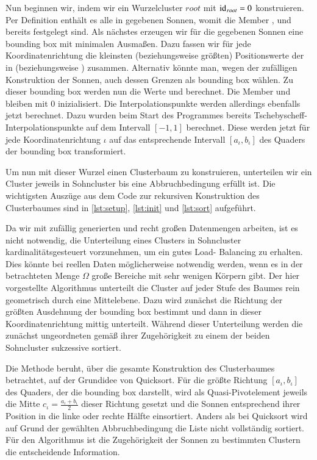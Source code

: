     Nun beginnen wir, indem wir ein Wurzelcluster $root$ mit $\tcode{id}_{root} = 0$ konstruieren. Per Definition enthält es alle in  gegebenen Sonnen, womit die Member ,  und 
     bereits festgelegt sind. Als nächstes erzeugen wir für die gegebenen Sonnen eine bounding box mit minimalen Ausmaßen. Dazu fassen wir für jede Koordinatenrichtung die kleinsten 
    (beziehungsweise größten) Positionswerte der  in  (beziehungsweise ) zusammen. Alternativ könnte man, wegen der zufälligen Konstruktion der Sonnen, auch dessen 
    Grenzen als bounding box wählen. Zu dieser bounding box werden nun die Werte \mbox{} und  berechnet. Die Member  und  bleiben mit $0$ 
    inizialisiert. Die Interpolationspunkte  werden allerdings ebenfalls jetzt berechnet. Dazu wurden beim Start des Programmes bereits Tschebyscheff-Interpolationspunkte auf dem Intervall 
    $[-1,1]$ berechnet. Diese werden jetzt für jede Koordinatenrichtung $\iota$ auf das entsprechende Intervall $[a_\iota, b_\iota]$ des Quaders der bounding box transformiert.
    
    Um nun mit dieser Wurzel einen Clusterbaum zu konstruieren, unterteilen wir ein Cluster jeweils in Sohncluster bis eine Abbruchbedingung erfüllt ist. 
    Die wichtigsten Auszüge aus dem Code zur rekursiven Konstruktion des Clusterbaumes sind in \autoref{lst:setup}, \autoref{lst:init} und \autoref{lst:sort} aufgeführt.
    
    Da wir mit zufällig generierten und recht großen Datenmengen arbeiten, ist es nicht notwendig, die Unterteilung eines Clusters in Sohncluster kardinalitätsgesteuert vorzunehmen, um ein gutes Load- 
    Balancing zu erhalten. Dies könnte bei reellen Daten möglicherweise notwendig werden, wenn es in der betrachteten Menge $\Omega$ große Bereiche mit sehr wenigen Körpern gibt. 
    Der hier vorgestellte Algorithmus unterteilt die Cluster auf jeder Stufe des Baumes rein geometrisch durch eine Mittelebene. Dazu wird zunächst die Richtung der größten Ausdehnung der bounding
    box bestimmt und dann in dieser Koordinatenrichtung mittig unterteilt. Während dieser Unterteilung werden die zunächst ungeordneten  gemäß ihrer Zugehörigkeit zu einem der beiden
    Sohncluster sukzessive sortiert.
    
    Die Methode  beruht, über die gesamte Konstruktion des Clusterbaumes betrachtet, auf der Grundidee von Quicksort. Für die größte Richtung $[a_\iota, b_\iota]$
    des Quaders, der die bounding box darstellt, wird als Quasi-Pivotelement jeweils die Mitte $c_\iota = \frac{a_\iota + b_\iota}{2}$ dieser Richtung gesetzt und die Sonnen entsprechend ihrer 
    Position in die linke oder rechte Hälfte einsortiert. Anders als bei Quicksort wird auf Grund der gewählten Abbruchbedingung die Liste nicht vollständig sortiert. Für den Algorithmus ist
    die Zugehörigkeit der Sonnen zu bestimmten Clustern die entscheidende Information.
    
